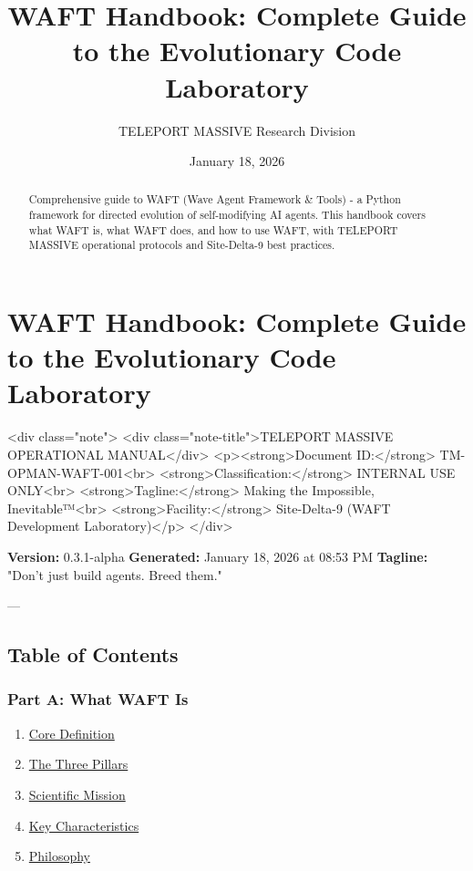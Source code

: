 \documentclass{article}
\title{WAFT Handbook: Complete Guide to the Evolutionary Code Laboratory}
\author{TELEPORT MASSIVE Research Division}
\date{January 18, 2026}
\begin{document}
\maketitle

\begin{abstract}
Comprehensive guide to WAFT (Wave Agent Framework & Tools) - a Python framework for directed evolution of self-modifying AI agents. This handbook covers what WAFT is, what WAFT does, and how to use WAFT, with TELEPORT MASSIVE operational protocols and Site-Delta-9 best practices.
\end{abstract}


\section{WAFT Handbook: Complete Guide to the Evolutionary Code Laboratory}

<div class="note">
    <div class="note-title">TELEPORT MASSIVE OPERATIONAL MANUAL</div>
    <p><strong>Document ID:</strong> TM-OPMAN-WAFT-001<br>
    <strong>Classification:</strong> INTERNAL USE ONLY<br>
    <strong>Tagline:</strong> Making the Impossible, Inevitable™<br>
    <strong>Facility:</strong> Site-Delta-9 (WAFT Development Laboratory)</p>
</div>

\textbf{Version:} 0.3.1-alpha  
\textbf{Generated:} January 18, 2026 at 08:53 PM  
\textbf{Tagline:} "Don't just build agents. Breed them."

---

\subsection{Table of Contents}

\subsubsection{Part A: What WAFT Is}
\begin{enumerate}
\item \href{#core-definition}{Core Definition}
\item \href{#the-three-pillars}{The Three Pillars}
\item \href{#scientific-mission}{Scientific Mission}
\item \href{#key-characteristics}{Key Characteristics}
\item \href{#philosophy}{Philosophy}
\end{enumerate}
\end{document}
